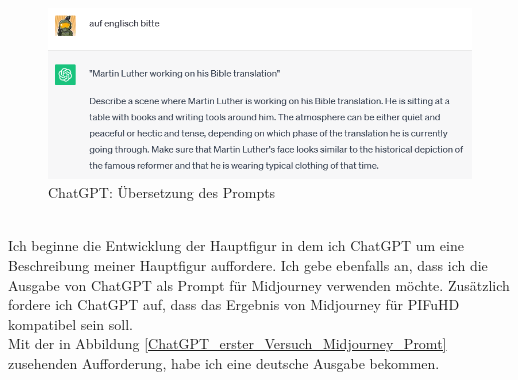 \begin{figure}
	\centering
	\includegraphics[width=14cm]{BilderFuerBA/03.png}
	\caption{ChatGPT: Übersetzung des Prompts}
	\label{ChatGPT_übersetzen}
\end{figure}
\\
Ich beginne die Entwicklung der Hauptfigur in dem ich ChatGPT um eine Beschreibung meiner Hauptfigur auffordere. Ich gebe ebenfalls an, dass ich die Ausgabe von ChatGPT als Prompt für Midjourney verwenden möchte. Zusätzlich fordere ich ChatGPT auf, dass das Ergebnis von Midjourney für PIFuHD kompatibel sein soll.
\\
Mit der in Abbildung \ref{ChatGPT_erster_Versuch_Midjourney_Promt} zusehenden Aufforderung, habe ich eine deutsche Ausgabe bekommen. 



